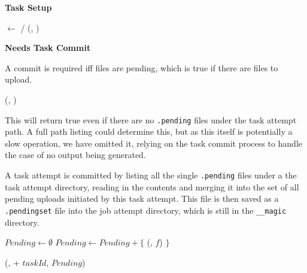 \documentclass[conference]{IEEEtran}
\begin{document}
\textbf{Task Setup}


\begin{procedure}
  \MagicVars

  \taskAttemptPath $\longleftarrow$ \jobAttemptPath/\taskAttemptId\;
  \mkdirs(\fs, \taskAttemptPath)\;

  \caption{MagicCommitter.setupTask()}
  \label{alg:MagicCommitter.setupTask}

\end{procedure}

\textbf{Needs Task Commit}

A commit is required iff files are pending, which is true if there are 
files to upload.

\begin{function}
\StagingVars

  \return \exists(\fs, \taskAttemptPath)\;

\caption{MagicCommitter.needsTaskCommit()}
\label{alg:MagicCommitter.needsTaskCommit}

\end{function}

This will return true even if there are no \texttt{.pending} files under the task attempt
path.
A full path listing could determine this, but as this itself is potentially a slow
operation, we have omitted it, relying on the task commit process to
handle the case of no output being generated.


A task attempt is committed by listing all the single \texttt{.pending} files
under a the task attempt directory, reading in the contents and merging it
into the set of all pending uploads initiated by this task attempt.
This file is then saved as a \texttt{.pendingset} file into the job attempt directory,
which is still in the \texttt{__magic} directory.

\begin{procedure}
\MagicVars

  $Pending \longleftarrow \emptyset$\;
   {
    $Pending \longleftarrow Pending + \{$ \loadPendingFile(\fs, $f$) $\}$\;
  }

  \savePendingSet(\fs, \jobAttemptPath + $taskId$, $Pending$)\;

\caption{MagicCommitter.commitTask()}
\label{alg:MagicCommitter.commitTask}

\end{procedure}
\end{document}
